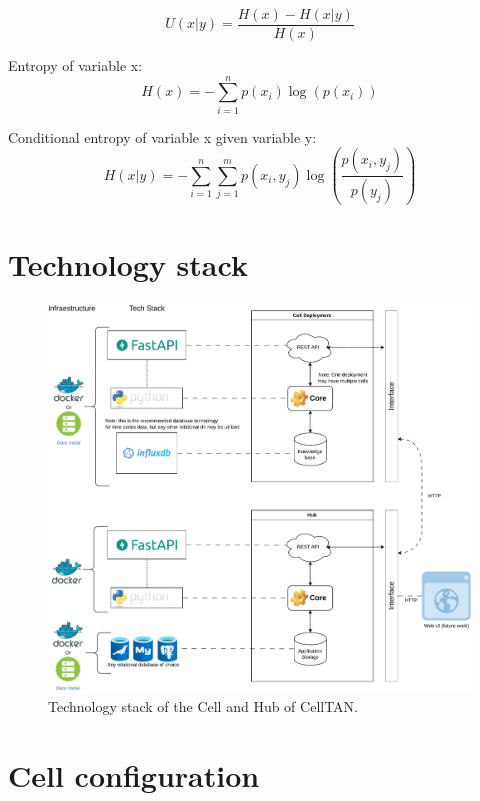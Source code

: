 \begin{equation}
U(x|y) = \frac{H(x) - H(x|y)}{H(x)}
\end{equation}

Entropy of variable x:
\begin{equation}
H(x) = -\sum_{i=1}^{n} p(x_i) \log(p(x_i))
\end{equation}

Conditional entropy of variable x given variable y:
\begin{equation}
H(x|y) = -\sum_{i=1}^{n} \sum_{j=1}^{m} p(x_i, y_j) \log\left(\frac{p(x_i, y_j)}{p(y_j)}\right)
\end{equation}


\section{Technology stack} \label{ap1:techstack}

\begin{figure}[h!]
    \centering
    \includegraphics[width=\linewidth]{figures/appendix/a_development/techstack.pdf}
    \caption{Technology stack of the Cell and Hub of CellTAN.}
    \label{fig:techstack}
\end{figure}


\section{Cell configuration} \label{ap1:config}
 
